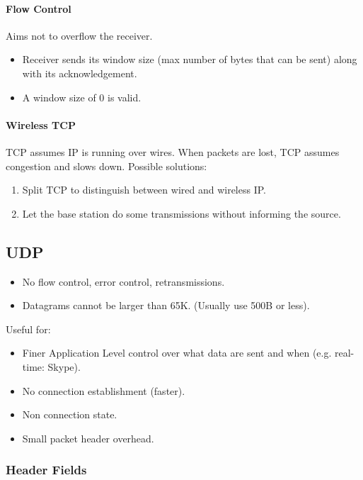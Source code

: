 \documentclass[twocolumn,english]{article}
\begin{document}
\paragraph{Flow Control}

Aims not to overflow the receiver.
\begin{itemize}
\item Receiver sends its window size (max number of bytes that can be sent)
along with its acknowledgement.
\item A window size of 0 is valid.
\end{itemize}

\paragraph{Wireless TCP}

TCP assumes IP is running over wires. When packets are lost, TCP assumes
congestion and slows down. Possible solutions:
\begin{enumerate}
\item Split TCP to distinguish between wired and wireless IP.
\item Let the base station do some transmissions without informing the source.
\end{enumerate}

\subsection{UDP}
\begin{itemize}
\item No flow control, error control, retransmissions.
\item Datagrams cannot be larger than 65K. (Usually use 500B or less).
\end{itemize}
Useful for:
\begin{itemize}
\item Finer Application Level control over what data are sent and when (e.g.
real-time: Skype).
\item No connection establishment (faster).
\item Non connection state.
\item Small packet header overhead.
\end{itemize}

\subsubsection*{Header Fields}
\end{document}
